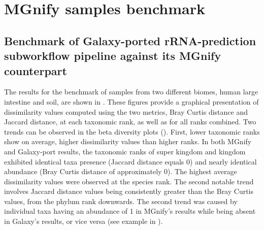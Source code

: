 \section{MGnify samples benchmark}\label{sec:MGnify's samples}
\subsection{Benchmark of Galaxy-ported rRNA-prediction subworkflow pipeline against its MGnify counterpart}\label{subsec:mgnifyVSgalaxy}
The results for the benchmark of samples from two different biomes, human large intestine and soil, are shown in . These figures provide a graphical presentation of dissimilarity values computed using the two metrics, Bray Curtis distance and Jaccard distance, at each taxonomic rank, as well as for all ranks combined.
Two trends can be observed in the beta diversity plots (). First, lower taxonomic ranks show on average, higher dissimilarity values than higher ranks. In both MGnify and Galaxy-port results, the taxonomic ranks of super kingdom and kingdom exhibited identical taxa presence (Jaccard distance equals 0) and nearly identical abundance (Bray Curtis distance of approximately 0). The highest average dissimilarity values were observed at the species rank. The second notable trend involves Jaccard distance values being consistently greater than the Bray Curtis values, from the phylum rank downwards. The second trend was caused by individual taxa having an abundance of 1 in MGnify's results while being absent in Galaxy's results, or vice versa (see example in ).
